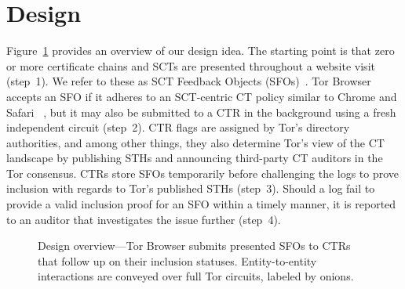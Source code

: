 \section{Design}
\label{sec:design}
Figure~\ref{fig:overview} provides an overview of our design idea.  The starting
point is that zero or more certificate chains and SCTs are presented
throughout a website visit (step~1).  We refer to these as SCT Feedback Objects
(SFOs)~\cite{nordberg}.  Tor Browser accepts an SFO if it adheres to an
SCT-centric CT policy similar to Chrome and Safari~%
\cite{chrome-policy,safari-policy}, but it may also be submitted to a CTR
in the background using a fresh independent circuit (step~2).  CTR flags are
assigned by Tor's directory authorities, and among other things, they also
determine Tor's view of the CT landscape by publishing STHs and announcing
third-party CT auditors in the Tor consensus.  CTRs store SFOs temporarily
before challenging the logs to prove inclusion with regards to Tor's published
STHs (step~3).  Should a log fail to provide a valid inclusion proof for an SFO
within a timely manner, it is reported to an auditor that investigates the issue
further (step~4).
\begin{figure}
	\centering
	
	\caption{%
		Design overview---Tor Browser submits presented SFOs to CTRs that follow
		up on their inclusion statuses.  Entity-to-entity interactions are
		conveyed over full Tor circuits, labeled by onions.
	}
	\label{fig:overview}
\end{figure}


